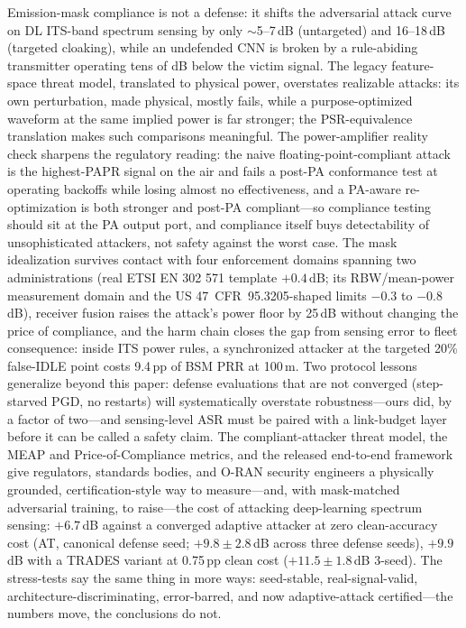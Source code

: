 \documentclass[review]{elsarticle}
\begin{document}
Emission-mask compliance is not a defense: it shifts the adversarial attack
curve on DL ITS-band spectrum sensing by only ${\sim}$5--7\,dB (untargeted)
and 16--18\,dB (targeted cloaking), while an undefended CNN is broken by a
rule-abiding transmitter operating tens of dB below the victim signal. The
legacy feature-space threat model, translated to physical power, overstates
realizable attacks: its own perturbation, made physical, mostly fails, while
a purpose-optimized waveform at the same implied power is far stronger; the
PSR-equivalence translation makes such comparisons meaningful. The
power-amplifier reality check sharpens the regulatory reading: the naive
floating-point-compliant attack is the highest-PAPR signal on the air and
fails a post-PA conformance test at operating backoffs while losing
almost no effectiveness, and a PA-aware re-optimization is both stronger
and post-PA compliant---so compliance testing should sit at the PA
output port, and compliance itself buys detectability of unsophisticated
attackers, not safety against the worst case. The mask idealization
survives contact with four enforcement domains spanning two
administrations (real ETSI EN 302 571 template $+0.4$\,dB; its
RBW/mean-power measurement domain and the US 47~CFR~95.3205-shaped
limits $-0.3$ to $-0.8$\,dB), receiver fusion raises the attack's power
floor by 25\,dB without changing the price of compliance, and
the harm chain closes the gap from sensing error to fleet consequence:
inside ITS power rules, a synchronized attacker at the targeted 20\%
false-IDLE point costs 9.4\,pp of BSM PRR at 100\,m. Two protocol
lessons generalize beyond this paper: defense evaluations that are not
converged (step-starved PGD, no restarts) will systematically overstate
robustness---ours did, by a factor of two---and sensing-level ASR must be
paired with a link-budget layer before it can be called a safety claim.
The compliant-attacker threat
model, the MEAP and Price-of-Compliance metrics, and the released
end-to-end framework give regulators, standards bodies, and O-RAN security
engineers a physically grounded, certification-style way to measure---and,
with mask-matched adversarial training, to
raise---the cost of attacking deep-learning spectrum sensing: $+6.7$\,dB
against a converged adaptive attacker at zero clean-accuracy cost (AT,
canonical defense seed; $+9.8\pm2.8$\,dB across three defense seeds),
$+9.9$\,dB with a TRADES variant at 0.75\,pp clean cost ($+11.5\pm1.8$\,dB
3-seed). The
stress-tests say the same thing in more ways: seed-stable, real-signal-valid,
architecture-discriminating, error-barred, and now adaptive-attack
certified---the numbers move, the conclusions do
not.
\end{document}
